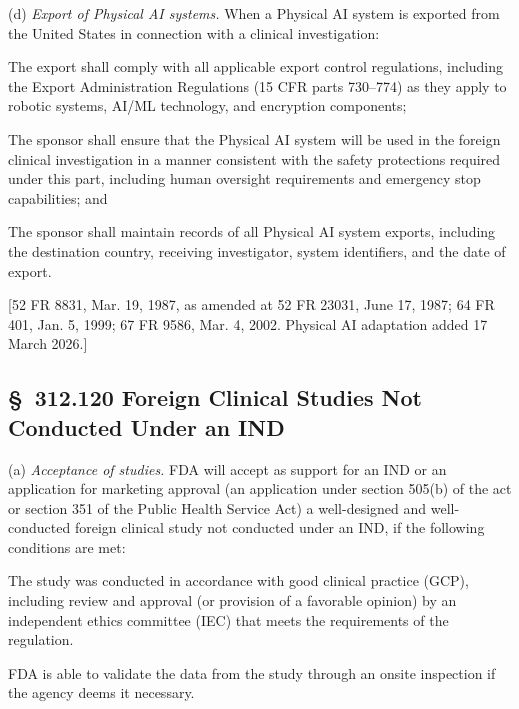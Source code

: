 (d) \textit{Export of Physical AI systems.} When a Physical AI system is exported from the United States in connection with a clinical investigation:

\begin{description}[leftmargin=0.8cm,style=sameline]
\item[(i)] The export shall comply with all applicable export control regulations, including the Export Administration Regulations (15 CFR parts 730--774) as they apply to robotic systems, AI/ML technology, and encryption components;
\item[(ii)] The sponsor shall ensure that the Physical AI system will be used in the foreign clinical investigation in a manner consistent with the safety protections required under this part, including human oversight requirements and emergency stop capabilities; and
\item[(iii)] The sponsor shall maintain records of all Physical AI system exports, including the destination country, receiving investigator, system identifiers, and the date of export.
\end{description}

[52 FR 8831, Mar. 19, 1987, as amended at 52 FR 23031, June 17, 1987; 64 FR 401, Jan. 5, 1999; 67 FR 9586, Mar. 4, 2002. Physical AI adaptation added 17 March 2026.]

\subsection{\S~312.120 Foreign Clinical Studies Not Conducted Under an IND}

(a) \textit{Acceptance of studies.} FDA will accept as support for an IND or an application for marketing approval (an application under section 505(b) of the act or section 351 of the Public Health Service Act) a well-designed and well-conducted foreign clinical study not conducted under an IND, if the following conditions are met:

\begin{description}[leftmargin=0.5cm,style=sameline]
\item[(1)] The study was conducted in accordance with good clinical practice (GCP), including review and approval (or provision of a favorable opinion) by an independent ethics committee (IEC) that meets the requirements of the regulation.
\item[(2)] FDA is able to validate the data from the study through an onsite inspection if the agency deems it necessary.
\end{description}

